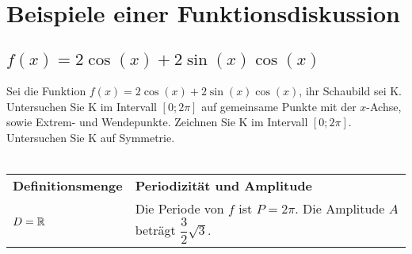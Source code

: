 \documentclass[../MAIN/main.tex]{subfiles}
\begin{document}
\section{Beispiele einer Funktionsdiskussion}

\subsection{$f(x)=2\cos(x)+2\sin(x)\cos(x)$}
Sei die Funktion $f(x)=2\cos(x)+2\sin(x)\cos(x)$, ihr Schaubild sei K.\\
Untersuchen Sie K im Intervall $[0;2\pi]$ auf gemeinsame Punkte mit der $x$-Achse, sowie Extrem- und Wendepunkte. Zeichnen Sie K im Intervall $[0;2\pi]$. Untersuchen Sie K auf Symmetrie.
\\\\
\begin{tabular}{ p{} | p{} }
  \textbf{Definitionsmenge}  & \textbf{Periodizität und Amplitude}                                                   \\
  $D = \mathbb{R}$                  & Die Periode von $f$ ist $P=2\pi$. Die Amplitude $A$ beträgt $\dfrac{3}{2}\sqrt{3}$.   \\
\end{tabular}
\\
\end{document}
